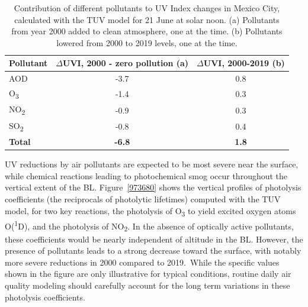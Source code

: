 \documentclass[journal=jacsat,manuscript=article]{achemso}
\begin{document}
\begin{table}[H]
  \centering
  \begin{tabular}{lcc}
    \hline
    Pollutant           & $\Delta$UVI, 2000 - zero pollution (a) & $\Delta$UVI, 2000-2019 (b) \\ \hline
    AOD                 & -3.7                                   & 0.8                        \\
    O\textsubscript{3}  & -1.4                                   & 0.3                        \\
    NO\textsubscript{2} & -0.9                                   & 0.3                        \\
    SO\textsubscript{2} & -0.8                                   & 0.4                        \\
    \textbf{Total}      & \textbf{-6.8}                          & \textbf{1.8}               \\\hline
  \end{tabular}
  \caption{Contribution of different pollutants to UV Index changes in Mexico City, calculated with the TUV model for 21 June at solar noon. (a) Pollutants from year 2000 added to clean atmosphere, one at the time. (b) Pollutants lowered from 2000 to 2019 levels, one at the time.}
  \label{table:year2000-2019}
\end{table}

UV reductions by air pollutants are expected to be most severe near the
surface, while chemical reactions leading to photochemical smog occur
throughout the vertical extent of the BL.
Figure~{\ref{973680}} shows the vertical profiles of
photolysis coefficients (the reciprocals of photolytic lifetimes) computed with the TUV model, for
two key reactions, the photolysis of O\textsubscript{3} to yield excited
oxygen atoms O(\textsuperscript{1}D), and the photolysis of NO\textsubscript{2}. In the
absence of optically active pollutants, these coefficients would be
nearly independent of altitude in the BL. However, the presence of
pollutants leads to a strong decrease toward the surface, with notably
more severe reductions in 2000 compared to 2019.~While the specific
values shown in the figure are only illustrative for typical conditions,
routine daily air quality modeling should carefully account for the long
term variations in these photolysis coefficients.
\end{document}

